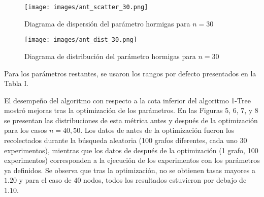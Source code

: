 \documentclass[conference]{IEEEtran}
\begin{document}
    \begin{figure}[htbp]
      \centering
      \begin{minipage}[t]{0.45\linewidth}
        \centering
        \texttt{[image: images/ant\_scatter\_30.png]}
        \caption{Diagrama de dispersión del parámetro hormigas para $n=30$}
        \label{fig:image29}
      \end{minipage}
      \hfill
      \begin{minipage}[t]{0.45\linewidth}
        \centering
        \texttt{[image: images/ant\_dist\_30.png]}
        \caption{Diagrama de distribución del parámetro hormigas para $n=30$}
        \label{fig:image30}
      \end{minipage}
    \end{figure}
Para los parámetros restantes, se usaron los rangos por defecto presentados en la Tabla I.
\begin{table}[h]
\centering
{}
\caption{Detalles de parámetros}
\label{tab:table3}
\end{table}

El desempeño del algoritmo con respecto a la cota inferior del algoritmo 1-Tree mostró mejoras tras la optimización de los parámetros. En las Figuras 5, 6, 7, y 8 se presentan las distribuciones de esta métrica antes y después de la optimización para los casos $n=40, 50$. Los datos de antes de la optimización fueron los recolectados durante la búsqueda aleatoria (100 grafos diferentes, cada uno 30 experimentos), mientras que los datos de después de la optimización (1 grafo, 100 experimentos) corresponden a la ejecución de los experimentos con los parámetros ya definidos. Se observa que tras la optimización, no se obtienen tasas mayores a $1.20$ y para el caso de $40$ nodos, todos los resultados estuvieron por debajo de $1.10$.
\end{document}
